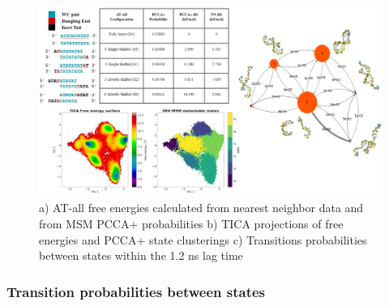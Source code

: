 \documentclass[journal=jpcbfk,manuscript=article]{achemso}
\begin{document}
\begin{figure}[ht!]
	\begin{center}
        \includegraphics[width=\textwidth]{Figs/figs_0804/AT-all_in_one.png}
        \caption{a) AT-all free energies calculated from nearest neighbor data and from MSM PCCA+ probabilities b) TICA projections of free energies and PCCA+ state clusterings c) Transitions probabilities between states within the 1.2 ns lag time}

        \label{fig:AT-all_in_one}
	\end{center}
\end{figure}

\subsubsection{Transition probabilities between states}
\end{document}

